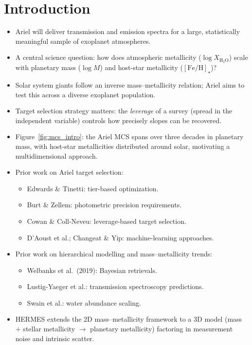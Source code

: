 \documentclass[twocolumn]{aastex631}
\begin{document}

\section{Introduction}\label{sec:intro}

\begin{itemize}
    \item Ariel will deliver transmission and emission spectra for a
          large, statistically meaningful sample of exoplanet
          atmospheres.
    \item A central science question: how does atmospheric metallicity
          ($\log X_{\mathrm{H_2O}}$) scale with planetary mass
          ($\log M$) and host-star metallicity
          ($[\mathrm{Fe/H}]_\star$)?
    \item Solar system giants follow an inverse mass--metallicity
          relation; Ariel aims to test this across a diverse exoplanet
          population.
    \item Target selection strategy matters: the \emph{leverage} of a
          survey (spread in the independent variable) controls how
          precisely slopes can be recovered.
    \item Figure~\ref{fig:mcs_intro}: the Ariel MCS spans over three
          decades in planetary mass, with host-star metallicities
          distributed around solar, motivating a multidimensional
          approach.
    \item Prior work on Ariel target selection:
    \begin{itemize}
        \item Edwards \& Tinetti: tier-based optimization.
        \item Burt \& Zellem: photometric precision requirements.
        \item Cowan \& Coll-Neveu: leverage-based target selection.
        \item D'Aoust et al.; Changeat \& Yip: machine-learning
              approaches.
    \end{itemize}
    \item Prior work on hierarchical modelling and mass--metallicity
          trends:
    \begin{itemize}
        \item Welbanks et al.\ (2019): Bayesian retrievals.
        \item Lustig-Yaeger et al.: transmission spectroscopy
              predictions.
        \item Swain et al.: water abundance scaling.
    \end{itemize}
    \item HERMES extends the 2D mass--metallicity framework to a 3D
          model (mass $+$ stellar metallicity $\to$ planetary
          metallicity) factoring in measurement noise and intrinsic
          scatter.
\end{itemize}
\end{document}
